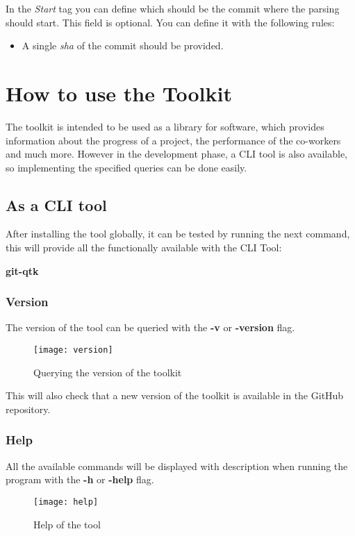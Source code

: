 In the \textit{Start} tag you can define which should be the commit where the parsing should start.
This field is optional.
You can define it with the following rules:

\begin{itemize}
	\item A single \textit{sha} of the commit should be provided.
\end{itemize}

\section{How to use the Toolkit}
The toolkit is intended to be used as a library for software, which provides information about the progress of a project, the performance of the co-workers and much more. However in the development phase, a CLI tool is also available, so implementing the specified queries can be done easily.

\subsection{As a CLI tool}
After installing the tool globally, it can be tested by running the next command, this will provide all the functionally available with the CLI Tool:

\textbf{git-qtk}
\subsubsection{Version}
The version of the tool can be queried with the \textbf{-v} or \textbf{-version} flag.

\begin{figure}[H]
	\centering
	\texttt{[image: version]}
	\caption{Querying the version of the toolkit}
	\label{fig:fig-version}
\end{figure}

This will also check that a new version of the toolkit is available in the GitHub repository\cite{repo}. 

\newpage
\subsubsection{Help}
All the available commands will be displayed with description when running the program with the \textbf{-h} or \textbf{-help} flag.

\begin{figure}[H]
	\centering
	\texttt{[image: help]}
	\caption{Help of the tool}
	\label{fig:fig-help-v2}
\end{figure}

